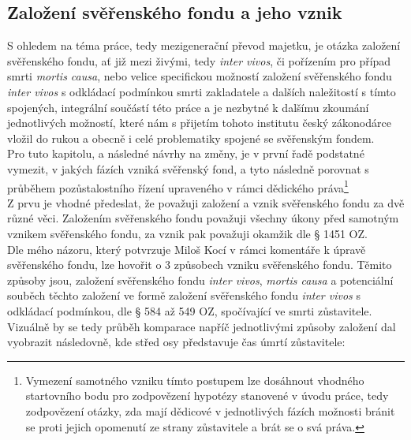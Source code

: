 \documentclass{article}
\begin{document}
\newpage
\thispagestyle{smallertextinheader}

\subsection{Založení svěřenského fondu a jeho vznik}

S ohledem na téma práce, tedy mezigenerační převod majetku, je otázka založení svěřenského fondu, ať již mezi živými, tedy \textit{inter vivos}, či pořízením pro případ smrti \textit{mortis causa}, nebo velice specifickou možností založení svěřenského fondu \textit{inter vivos} s odkládací podmínkou smrti zakladatele a dalších naležitostí s tímto spojených, integrální součástí této práce a je nezbytné k dalšímu zkoumání jednotlivých možností, které nám s přijetím tohoto institutu český zákonodárce vložil do rukou a obecně i celé problematiky spojené se svěřenským fondem. \\

Pro tuto kapitolu, a následné návrhy na změny, je v první řadě podstatné vymezit,  v jakých fázích vzniká svěřenský fond, a tyto následně porovnat s průběhem pozůstalostního řízení upraveného v rámci dědického práva\footnote{Vymezení samotného vzniku tímto postupem lze dosáhnout vhodného startovního bodu pro zodpovězení hypotézy stanovené v úvodu práce, tedy zodpovězení otázky, zda mají dědicové v jednotlivých fázích možnosti bránit se proti jejich opomenutí ze strany zůstavitele a brát se o svá práva.} \\ 

Z prvu je vhodné předeslat, že považuji založení a vznik svěřenského fondu za dvě různé věci. Založením svěřenského fondu považuji všechny úkony před samotným vznikem svěřenského fondu, za vznik pak považuji okamžik dle § 1451 OZ.\\

Dle mého názoru, který potvrzuje Miloš Kocí v rámci komentáře k úpravě svěřenského fondu, lze hovořit o 3 způsobech vzniku svěřenského fondu. Těmito způsoby jsou, založení svěřenského fondu \textit{inter vivos}, \textit{mortis causa} a potenciální souběch těchto založení ve formě založení svěřenského fondu \textit{inter vivos} s odkládací podmínkou, dle § 584 až 549 OZ, spočívající ve smrti zůstavitele. \\



Vizuálně by se tedy průběh komparace napříč jednotlivými způsoby založení dal vyobrazit následovně, kde střed osy představuje čas úmrtí zůstavitele:
\end{document}
